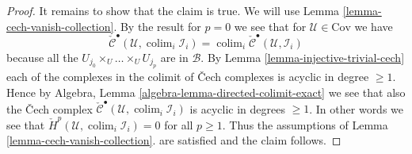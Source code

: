 \documentclass[10pt,a4paper]{amsart}
\theoremstyle{plain}
\theoremstyle{definition}
\theoremstyle{remark}
\numberwithin{equation}{subsection}
\def\colim{\mathop{\mathrm{colim}}\nolimits}
\begin{document}
\begin{proof}
\medskip\noindent
It remains to show that the claim is true. We will use
Lemma \ref{lemma-cech-vanish-collection}.
By the result for $p = 0$ we see that for $\mathcal{U} \in \text{Cov}$
we have
$$
\check{\mathcal{C}}^\bullet(\mathcal{U}, \colim_i \mathcal{I}_i)
=
\colim_i \check{\mathcal{C}}^\bullet(\mathcal{U}, \mathcal{I}_i)
$$
because all the $U_{j_0} \times_U \ldots \times_U U_{j_p}$
are in $\mathcal{B}$. By
Lemma \ref{lemma-injective-trivial-cech}
each of the complexes in the colimit of {\v C}ech complexes is
acyclic in degree $\geq 1$. Hence by
Algebra, Lemma \ref{algebra-lemma-directed-colimit-exact}
we see that also the {\v C}ech complex
$\check{\mathcal{C}}^\bullet(\mathcal{U}, \colim_i \mathcal{I}_i)$
is acyclic in degrees $\geq 1$. In other words we see that
$\check{H}^p(\mathcal{U}, \colim_i \mathcal{I}_i) = 0$
for all $p \geq 1$. Thus the assumptions of
Lemma \ref{lemma-cech-vanish-collection}.
are satisfied and the claim follows.
\end{proof}
\end{document}
